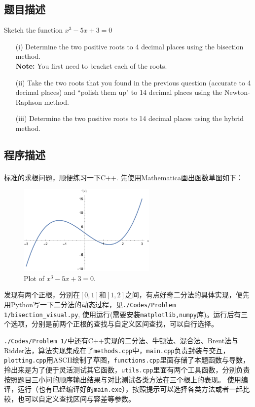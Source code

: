 \subsection{题目描述}
Sketch the function \boldmath\(x^3 - 5x + 3 = 0\)\unboldmath
\begin{enumerate}
    \item[(i)] Determine the two positive roots to 4 decimal places using the bisection method.\\
          \textbf{Note:} You first need to bracket each of the roots.

    \item[(ii)] Take the two roots that you found in the previous question (accurate to 4 decimal places) and ``polish them up" to 14 decimal places using the Newton-Raphson method.

    \item[(iii)] Determine the two positive roots to 14 decimal places using the hybrid method.
\end{enumerate}

\subsection{程序描述}
标准的求根问题，顺便练习一下C++. 先使用Mathematica\textsuperscript{\textregistered}画出函数草图如下：
\begin{figure}[H]
    \centering
    \includegraphics[width=0.6\textwidth]{./Figs/1_plot.pdf}  %
    \caption{Plot of $x^3 - 5x + 3 = 0$.}
\end{figure}
发现有两个正根，分别在$[0, 1]$和$[1, 2]$之间，有点好奇二分法的具体实现，便先用Python写一下二分法的动态过程，见\texttt{./Codes/Problem 1/bisection\_visual.py}, 使用运行(需要安装\texttt{matplotlib,numpy}库)。运行后有三个选项，分别是前两个正根的查找与自定义区间查找，可以自行选择。

\texttt{./Codes/Problem 1/}中还有C++实现的二分法、牛顿法、混合法、Brent法与Ridder法，算法实现集成在了\texttt{methods.cpp}中，\texttt{main.cpp}负责封装与交互，\texttt{plotting.cpp}用ASCII绘制了草图，\texttt{functions.cpp}里面存储了本题函数与导数，拎出来是为了便于灵活测试其它函数，\texttt{utils.cpp}里面有两个工具函数，分别负责按照题目三小问的顺序输出结果与对比测试各类方法在三个根上的表现。
使用编译，运行（也有已经编译好的\texttt{main.exe}），按照提示可以选择各类方法或者一起比较，也可以自定义查找区间与容差等参数。
